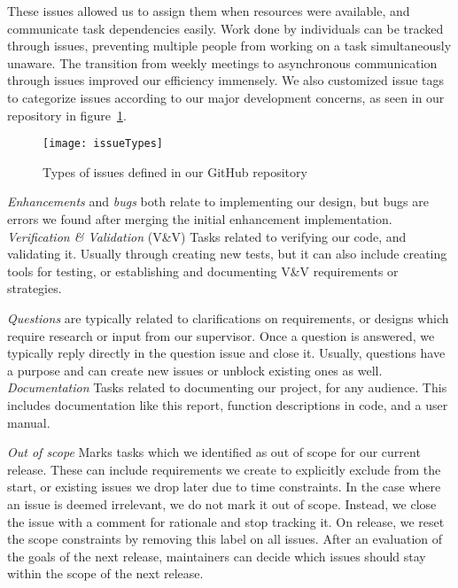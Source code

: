 These issues allowed us to assign them when resources were available, and communicate task dependencies easily.
Work done by individuals can be tracked through issues,
preventing multiple people from working on a task simultaneously unaware.
The transition from weekly meetings to asynchronous communication through issues improved our efficiency immensely.
We also customized issue tags to categorize issues
according to our major development concerns, as seen in our repository in figure~\ref{fig:issueTypes}.
\begin{figure}[ht]
    \centering
    \texttt{[image: issueTypes]}
    \caption{Types of issues defined in our GitHub repository}
    \label{fig:issueTypes}
\end{figure}

\textit{Enhancements} and \textit{bugs} both relate to implementing our design,
but bugs are errors we found after merging the initial enhancement implementation.
\textit{Verification \& Validation} (V\&V) Tasks related to verifying our code, and validating it.
Usually through creating new tests, but it can also include creating tools for testing,
or establishing and documenting V\&V requirements or strategies.

\textit{Questions} are typically related to clarifications on requirements,
or designs which require research or input from our supervisor.
Once a question is answered, we typically reply directly in the question issue and close it.
Usually, questions have a purpose and can create new issues or unblock existing ones as well.
\textit{Documentation} Tasks related to documenting our project, for any audience.
This includes documentation like this report, function descriptions in code, and a user manual.

\textit{Out of scope} Marks tasks which we identified as out of scope for our current release.
These can include requirements we create to explicitly exclude from the start,
or existing issues we drop later due to time constraints.
In the case where an issue is deemed irrelevant, we do not mark it out of scope.
Instead, we close the issue with a comment for rationale and stop tracking it.
On release, we reset the scope constraints by removing this label on all issues.
After an evaluation of the goals of the next release,
maintainers can decide which issues should stay within the scope of the next release.

